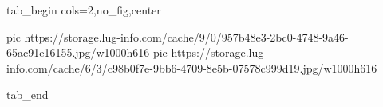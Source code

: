  
 
 
 
 


\ifcmt
  tab_begin cols=2,no_fig,center

     pic https://storage.lug-info.com/cache/9/0/957b48e3-2bc0-4748-9a46-65ac91e16155.jpg/w1000h616
		 pic https://storage.lug-info.com/cache/6/3/c98b0f7e-9bb6-4709-8e5b-07578c999d19.jpg/w1000h616

  tab_end
\fi
